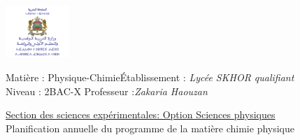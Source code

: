 \documentclass[12pt]{article}
\newcommand\headerMe[2]{\noindent{}#1\hfill#2}
\begin{document}
\begin{center}
\includegraphics[width = 0.18\textwidth]{./img/logoMin.png}
\vspace{-3cm}
\end{center}
\headerMe{Matière : Physique-Chimie}{Établissement : \emph{Lycée SKHOR qualifiant}}\\
\headerMe{ Niveau : 2BAC-X }{  Professeur :\emph{Zakaria Haouzan}}\\

\begin{center}
	\vspace{0.5cm}
\underline{Section des sciences expérimentales: Option Sciences physiques
}
\\
\hrulefill
\Large{Planification annuelle
du programme de la matière chimie physique}
\hrulefill\\
\end{center}
\end{document}
